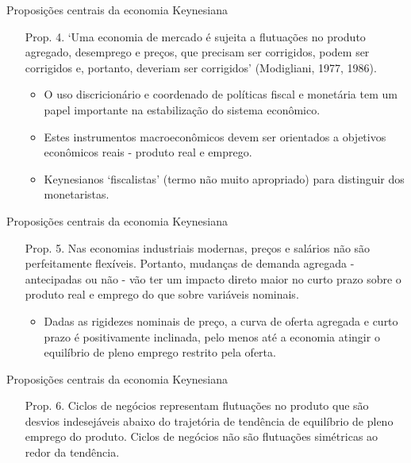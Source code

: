 \documentclass[10pt]{beamer}
\begin{document}
\begin{frame}{Proposições centrais da economia Keynesiana}
    \begin{enumerate}
        \item[Prop. 4.] `Uma economia de mercado é sujeita a flutuações no produto agregado, desemprego e preços, que precisam ser corrigidos, podem ser corrigidos e, portanto, deveriam ser corrigidos' (Modigliani, 1977, 1986).
        \bigskip
        \begin{itemize}
            \item O uso discricionário e coordenado de políticas fiscal e monetária tem um papel importante na estabilização do sistema econômico.
            \bigskip
            \item Estes instrumentos macroeconômicos devem ser orientados a objetivos econômicos reais - produto real e emprego.
            \bigskip
            \item Keynesianos `fiscalistas' (termo não muito apropriado) para distinguir dos monetaristas.
        \end{itemize}
    \end{enumerate}
\end{frame}

\begin{frame}{Proposições centrais da economia Keynesiana}
    \begin{enumerate}
        \item[Prop. 5.] Nas economias industriais modernas, preços e salários não são perfeitamente flexíveis. Portanto, mudanças de demanda agregada - antecipadas ou não - vão ter um impacto direto maior no curto prazo sobre o produto real e emprego do que sobre variáveis nominais.
        \bigskip
        \begin{itemize}
            \item Dadas as rigidezes nominais de preço, a curva de oferta agregada e curto prazo é positivamente inclinada, pelo menos até a economia atingir o equilíbrio de pleno emprego restrito pela oferta.
        \end{itemize}
    \end{enumerate}
\end{frame}

\begin{frame}{Proposições centrais da economia Keynesiana}
    \begin{enumerate}
        \item[Prop. 6.] Ciclos de negócios representam flutuações no produto que são desvios indesejáveis abaixo do trajetória de tendência de equilíbrio de pleno emprego do produto. Ciclos de negócios não são flutuações simétricas ao redor da tendência.
    \end{enumerate}
\end{frame}
\end{document}

